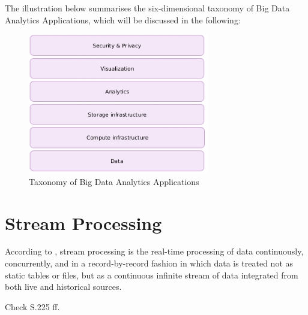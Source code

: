 The illustration below summarises the six-dimensional taxonomy \cite{Bitk14, Csa14} of Big Data Analytics Applications,
which will be discussed in the following:
\begin{figure}[H]
	\centering
	\includegraphics[width=0.7\textwidth]{../images/05-big-data-taxonomy.jpg}
	\caption{Taxonomy of Big Data Analytics Applications \cite{Bitk14, Csa14}}
	\label{taxonomy-bigdata-applications}
\end{figure}




\section{Stream Processing}
According to \cite{Klepp16}, stream processing is the real-time processing of data continuously,
concurrently, and in a record-by-record fashion in which data is treated not as static tables
or files, but as a continuous infinite stream of data integrated from both live and historical
sources.

Check \cite{Marz15} S.225 ff.




